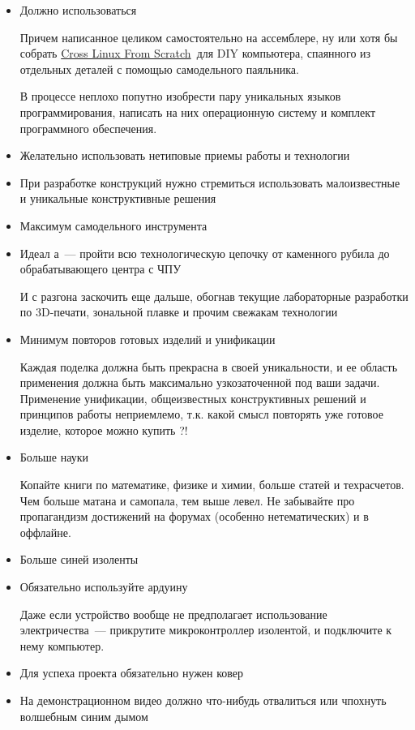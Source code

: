 \documentclass{magazine}
\begin{document}
\begin{multicols}{2}
\begin{itemize}
\item Должно использоваться 

Причем написанное целиком самостоятельно на ассемблере, ну или хотя бы собрать
\href{http://cross-lfs.org/}{Cross Linux From Scratch}\ для DIY компьютера,
спаянного из отдельных деталей с помощью самодельного паяльника.

В процессе неплохо попутно изобрести пару уникальных языков программирования,
написать на них операционную систему и комплект программного обеспечения.

\item Желательно использовать нетиповые приемы работы и технологии

\item При разработке конструкций нужно стремиться использовать малоизвестные и
уникальные конструктивные решения

\item Максимум самодельного инструмента

\item Идеал \scr а\ --- пройти всю технологическую цепочку от каменного 
рубила до обрабатывающего центра с ЧПУ

И с разгона заскочить еще дальше, обогнав текущие лабораторные разработки по
3D-печати, зональной плавке и прочим свежакам технологии

\item Минимум повторов готовых изделий и унификации

Каждая поделка должна быть прекрасна в своей уникальности, и ее область
применения должна быть максимально узкозаточенной под ваши задачи. Применение
унификации, общеизвестных конструктивных решений и принципов работы неприемлемо,
т.к. какой смысл повторять уже готовое изделие, которое можно купить ?!

\item Больше науки

Копайте книги по математике, физике и химии, больше статей и техрасчетов.
Чем больше матана и самопала, тем выше левел. Не забывайте про пропагандизм
достижений на форумах (особенно нетематических) и в оффлайне.

\item Больше синей изоленты

\item Обязательно используйте ардуину

Даже если устройство вообще не предполагает использование электричества\ ---
прикрутите микроконтроллер изолентой, и подключите к нему компьютер.

\item Для успеха проекта обязательно нужен ковер

\item На демонстрационном видео должно что-нибудь отвалиться или чпохнуть
волшебным синим дымом
   
\end{itemize}	

\end{multicols}
\end{document}
